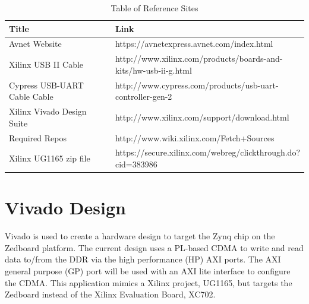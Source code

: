 \documentclass[12pt]{article}
\begin{document}
\begin{table}[htbp!]
  \begin{tabular}{|p{0.4\linewidth}|p{0.6\linewidth}|}
    \hline
    \textbf{Title} & \textbf{Link}\\ \hline
     Avnet Website&https://avnetexpress.avnet.com/index.html \\ \hline
     Xilinx USB II Cable& http://www.xilinx.com/products/boards-and-kits/hw-usb-ii-g.html \\ \hline
     Cypress USB-UART Cable Cable&http://www.cypress.com/products/usb-uart-controller-gen-2  \\ \hline
     Xilinx Vivado Design Suite&http://www.xilinx.com/support/download.html  \\ \hline
     Required Repos&http://www.wiki.xilinx.com/Fetch+Sources \\ \hline
     Xilinx UG1165 zip file&https://secure.xilinx.com/webreg/clickthrough.do?cid=383986 \\ \hline

  \end{tabular}
  \caption{Table of Reference Sites}
  \label{table:references}
\end{table}

\section{Vivado Design}  Vivado is used to create a hardware design to target the Zynq chip on the Zedboard platform.  The current design uses a PL-based CDMA to write and read data to/from the DDR via the high performance (HP) AXI ports.  The AXI general purpose (GP) port will be used with an AXI lite interface to configure the CDMA.  This application mimics a Xilinx project, UG1165, but targets the Zedboard instead of the Xilinx Evaluation Board, XC702.
\end{document}
